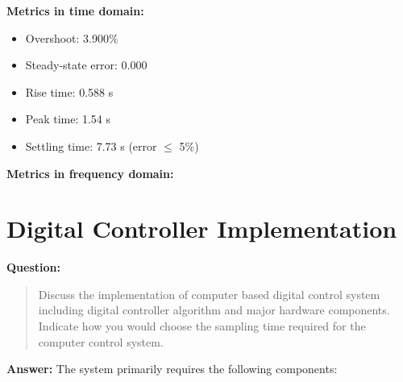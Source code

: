\documentclass[12pt, oneside]{article}
\begin{document}
\textbf{Metrics in time domain:}
\begin{itemize}
            \item Overshoot: 3.900\%
            \item Steady-state error: 0.000
            \item Rise time: 0.588 s
            \item Peak time: 1.54 s
            \item Settling time: 7.73 s (error $\leq$ 5\%)
        \end{itemize}
\textbf{Metrics in frequency domain:}
\section{Digital Controller Implementation}
\textbf{Question:}
\begin{quote}
    Discuss the implementation of computer based digital control system including digital controller algorithm and major hardware components. Indicate how you would choose the sampling time required for the computer control system.
\end{quote}
\textbf{Answer:}
The system primarily requires the following components:
\end{document}
